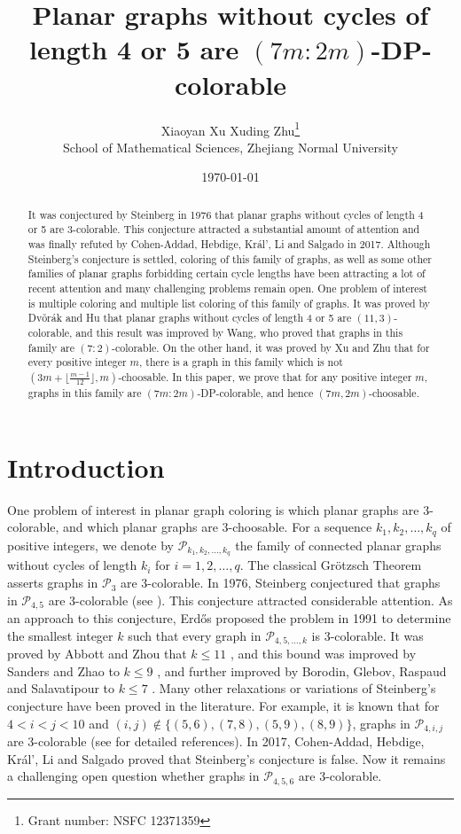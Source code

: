 \documentclass{article}
\title{Planar graphs without cycles of length 4 or 5 are $(7m:2m)$-DP-colorable}
\author{Xiaoyan Xu \qquad  Xuding Zhu\thanks{Grant number: NSFC 12371359} \\
School of Mathematical Sciences, Zhejiang Normal University}
\date{\today}
\begin{document}
\maketitle
\begin{abstract}
  It was conjectured by Steinberg in 1976  that   planar graphs without cycles of length 4 or 5 are 3-colorable. This conjecture  attracted a substantial amount of attention and was finally refuted by  Cohen-Addad,  Hebdige, Kr\'{a}l',   Li and Salgado in 2017. Although Steinberg's conjecture is settled, coloring of this family of graphs, as well as some other families of planar graphs forbidding certain cycle lengths have been attracting a lot of recent attention and many challenging problems remain open. One problem of interest is multiple coloring and multiple list coloring of this family of graphs.  It was proved by Dv\v{o}r\'{a}k and Hu that 
  planar graphs without cycles of length 4 or 5  are $(11,3)$-colorable, and this result was improved by Wang, who proved  that graphs in this family are $(7:2)$-colorable. On the other hand, it was proved by Xu and Zhu that for every positive integer $m$, there is a graph in this family which is not $(3m + \lfloor \frac{m-1}{12} \rfloor, m)$-choosable. 
  In this paper, we prove that for any positive integer $m$, graphs in this family are $(7m:2m)$-DP-colorable, and hence $(7m,2m)$-choosable.  
\end{abstract}

\section{Introduction}

One problem of interest in planar graph coloring is which planar graphs are 3-colorable, and which planar graphs are 3-choosable.  For a sequence $k_1,k_2, \ldots, k_q$ of positive integers, we denote by $\mathcal{P}_{k_1,k_2, \ldots, k_q}$ the family of connected planar graphs without cycles of length $k_i$ for $i=1,2,\ldots, q$.
The classical Gr\"{o}tzsch Theorem \cite{MR116319} asserts graphs in $\mathcal{P}_{3}$  are 3-colorable.  In 1976, Steinberg conjectured that graphs in $\mathcal{P}_{4,5}$ are 3-colorable   (see \cite{MR3004485}). This conjecture attracted considerable attention. As an approach to this conjecture,  Erd\H{o}s proposed the problem in 1991 to determine the smallest integer  $k$ such that every  graph in $\mathcal{P}_{4,5, \ldots, k}$ is  3-colorable. It was proved by Abbott and Zhou  that $k \le 11$  \cite{MR1148923}, and this bound was improved by Sanders and Zhao  to $k \le 9$ \cite{MR1326930}, and further improved by Borodin, Glebov, Raspaud and Salavatipour  to $k \le 7$ \cite{MR2117940}. Many other relaxations or variations of Steinberg's conjecture have been proved in the literature. For example, it is known   that  for $4 < i < j < 10$  and $(i,j) \notin \{(5,6), (7,8), (5,9),(8,9)\}$,   graphs in $\mathcal{P}_{4,i,j}$  are 3-colorable (see \cite{KangJinZhu} for detailed references). 
In 2017,  Cohen-Addad,  Hebdige, Kr\'{a}l',   Li and Salgado \cite{MR3575214} proved that 
Steinberg's conjecture is false. Now it remains a challenging open question whether graphs in $\mathcal{P}_{4,5,6}$  are 3-colorable.  
\end{document}
